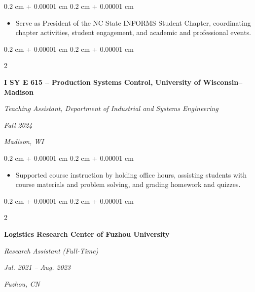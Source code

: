 \documentclass[10pt, letterpaper]{article}
\newenvironment{highlights}{
    \begin{itemize}[
        topsep=0.10 cm,
        parsep=0.10 cm,
        partopsep=0pt,
        itemsep=0pt,
        leftmargin=0.4 cm + 10pt
    ]
}{
    \end{itemize}
} %
\newenvironment{onecolentry}{
    \begin{adjustwidth}{
        0.2 cm + 0.00001 cm
    }{
        0.2 cm + 0.00001 cm
    }
}{
    \end{adjustwidth}
} %
\newenvironment{twocolentry}[2][]{
    \onecolentry
    \def\secondColumn{#2}
    \setcolumnwidth{\fill, 4.5 cm}
    \begin{paracol}{2}
}{
    \switchcolumn \raggedleft \secondColumn
    \end{paracol}
    \endonecolentry
} %
\begin{document}
\vspace{0.1cm}

\begin{onecolentry}
    \begin{highlights}
        \item Serve as President of the NC State INFORMS Student Chapter, coordinating chapter activities, student engagement, and academic and professional events.
    \end{highlights}
\end{onecolentry}


\vspace{0.13 cm}

\begin{twocolentry}{
    \textit{Fall 2024}

    \vspace{0.1cm}
    \textit{Madison, WI}
}
    \textbf{I SY E 615 -- Production Systems Control, University of Wisconsin--Madison}

    \vspace{0.1cm}
    \textit{Teaching Assistant, Department of Industrial and Systems Engineering}
\end{twocolentry}

\vspace{0.1cm}

\begin{onecolentry}
    \begin{highlights}
        \item Supported course instruction by holding office hours, assisting students with course materials and problem solving, and grading homework and quizzes.
    \end{highlights}
\end{onecolentry}


\vspace{0.13 cm}

\begin{twocolentry}{
    \textit{Jul. 2021 – Aug. 2023}

    \vspace{0.1cm}
    \textit{Fuzhou, CN}
}
    \textbf{Logistics Research Center of Fuzhou University}

    \vspace{0.1cm}
    \textit{Research Assistant (Full-Time)}
\end{twocolentry}

\vspace{0.1cm}
\end{document}
